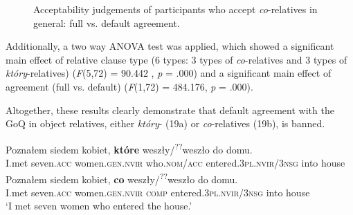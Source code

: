 \documentclass[output=paper]{langsci/langscibook}
\begin{document}
\begin{figure}
\caption{Acceptability judgements of participants who accept \textit{co}{}-relatives in general: full vs. default agreement.}
\label{fig:leska:3}
\end{figure}

Additionally, a two way ANOVA test was applied, which showed a significant main effect of relative clause type (6 types: 3 types of \textit{co}{}-relatives and 3 types of \textit{który}{}-relatives) (\textit{F}(5,72) = 90.442 , \textit{p} = .000) and a significant main effect of agreement (full vs. default) (\textit{F}(1,72) = 484.176, \textit{p} = .000).


Altogether, these results clearly demonstrate that default agreement with the GoQ in object relatives, either \textit{który}{}- (19a) or \textit{co}{}-relatives (19b), is banned. 

\ea%
    \label{ex:leska:19}
    \ea
    \gll Poznałem   siedem   kobiet,     \textbf{które} weszły/\textsuperscript{??}weszło       do   domu.\\
         I.met     seven.\textsc{acc}   women.\textsc{gen.nvir}  who.\textsc{nom/acc} entered.\textsc{3pl.nvir}/\textsc{3nsg}   into   house \\
    \ex
    \gll Poznałem   siedem   kobiet,     \textbf{co} weszły/\textsuperscript{??}weszło       do   domu.\\
          I.met     seven.\textsc{acc}   women.\textsc{gen.nvir}  \textsc{comp}     entered.\textsc{3pl.nvir}/\textsc{3nsg}   into  house        \\
    \glt ‘I met seven women who entered the house.’
    \z
\z
\end{document}
